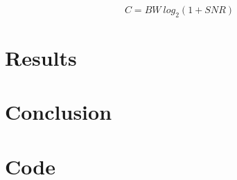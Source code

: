 \documentclass[twocolumn]{article}
\begin{document}
\begin{equation}
\label{shannon}
C=BW~log_2(1+SNR)
\end{equation}

\section{Results}




\section{Conclusion}



\onecolumn
\appendix
\section{Code}

\end{document}

